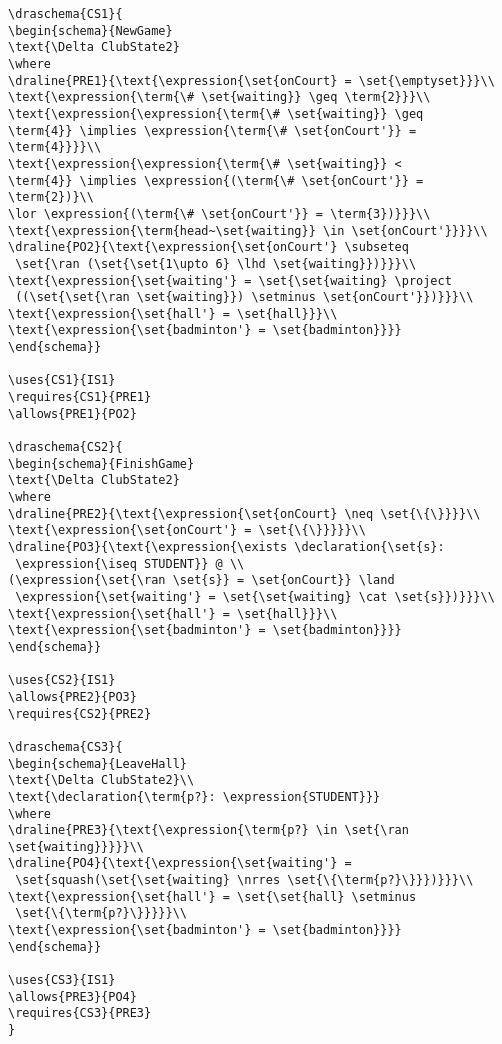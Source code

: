 \begin{verbatim}
\draschema{CS1}{
\begin{schema}{NewGame}
\text{\Delta ClubState2}
\where
\draline{PRE1}{\text{\expression{\set{onCourt} = \set{\emptyset}}}\\
\text{\expression{\term{\# \set{waiting}} \geq \term{2}}}\\
\text{\expression{\expression{\term{\# \set{waiting}} \geq 
\term{4}} \implies \expression{\term{\# \set{onCourt'}} = \term{4}}}}\\
\text{\expression{\expression{\term{\# \set{waiting}} < 
\term{4}} \implies \expression{(\term{\# \set{onCourt'}} = \term{2})}\\
\lor \expression{(\term{\# \set{onCourt'}} = \term{3})}}}\\
\text{\expression{\term{head~\set{waiting}} \in \set{onCourt'}}}}\\
\draline{PO2}{\text{\expression{\set{onCourt'} \subseteq
 \set{\ran (\set{\set{1\upto 6} \lhd \set{waiting}})}}}\\
\text{\expression{\set{waiting'} = \set{\set{waiting} \project
 ((\set{\set{\ran \set{waiting}}) \setminus \set{onCourt'}})}}}\\
\text{\expression{\set{hall'} = \set{hall}}}\\
\text{\expression{\set{badminton'} = \set{badminton}}}}
\end{schema}}

\uses{CS1}{IS1}
\requires{CS1}{PRE1}
\allows{PRE1}{PO2}

\draschema{CS2}{
\begin{schema}{FinishGame}
\text{\Delta ClubState2}
\where
\draline{PRE2}{\text{\expression{\set{onCourt} \neq \set{\{\}}}}\\
\text{\expression{\set{onCourt'} = \set{\{\}}}}}\\
\draline{PO3}{\text{\expression{\exists \declaration{\set{s}:
 \expression{\iseq STUDENT}} @ \\
(\expression{\set{\ran \set{s}} = \set{onCourt}} \land
 \expression{\set{waiting'} = \set{\set{waiting} \cat \set{s}})}}}\\
\text{\expression{\set{hall'} = \set{hall}}}\\
\text{\expression{\set{badminton'} = \set{badminton}}}}
\end{schema}}

\uses{CS2}{IS1}
\allows{PRE2}{PO3}
\requires{CS2}{PRE2}

\draschema{CS3}{
\begin{schema}{LeaveHall}
\text{\Delta ClubState2}\\
\text{\declaration{\term{p?}: \expression{STUDENT}}}
\where
\draline{PRE3}{\text{\expression{\term{p?} \in \set{\ran \set{waiting}}}}}\\
\draline{PO4}{\text{\expression{\set{waiting'} =
 \set{squash(\set{\set{waiting} \nrres \set{\{\term{p?}\}}})}}}\\
\text{\expression{\set{hall'} = \set{\set{hall} \setminus
 \set{\{\term{p?}\}}}}}\\
\text{\expression{\set{badminton'} = \set{badminton}}}}
\end{schema}}

\uses{CS3}{IS1}
\allows{PRE3}{PO4}
\requires{CS3}{PRE3}
}


\end{verbatim}